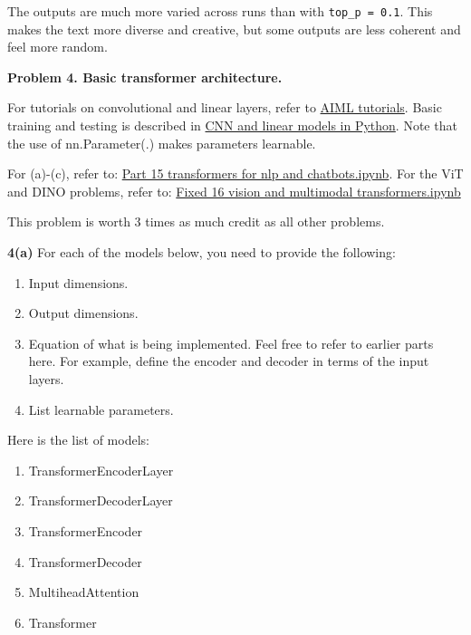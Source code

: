 \documentclass[10pt]{article}
\begin{document}
The outputs are much more varied across runs than with \texttt{top\_p = 0.1}. This makes the text more diverse and creative, but some outputs are less coherent and feel more random.

\newpage

\textbf{Problem 4. Basic transformer architecture.}

For tutorials on convolutional and linear layers, refer to \href{https://github.com/pattichis/AIML}{AIML tutorials}. Basic training and testing is described in \href{https://colab.research.google.com/github/pattichis/AIML/blob/main/Session_16_models.ipynb}{CNN and linear models in Python}. Note that the use of nn.Parameter(.) makes parameters learnable.

For (a)-(c), refer to: \href{https://colab.research.google.com/drive/1T1-v3hXGcXqsljqvuRmXmlGUBS7qYo_b?usp=sharing}{Part 15 transformers for nlp and chatbots.ipynb}. For the ViT and DINO problems, refer to: \href{https://colab.research.google.com/drive/1gFiqft0ngNU7nIxpqfbfJ94XhnSdju5u?usp=sharing}{Fixed 16 vision and multimodal transformers.ipynb}

{\color{blue} This problem is worth 3 times as much credit as all other problems.}

\textbf{4(a)} For each of the models below, you need to provide the following:

\begin{enumerate}[label=\alph*.]
    \item Input dimensions.
    \item Output dimensions.
    \item Equation of what is being implemented. Feel free to refer to earlier parts here. For example, define the encoder and decoder in terms of the input layers.
    \item List learnable parameters.
\end{enumerate}

Here is the list of models:
\begin{enumerate}[label=\roman*.]
    \item TransformerEncoderLayer
    \item TransformerDecoderLayer
    \item TransformerEncoder
    \item TransformerDecoder
    \item MultiheadAttention
    \item Transformer
\end{enumerate}
\end{document}
